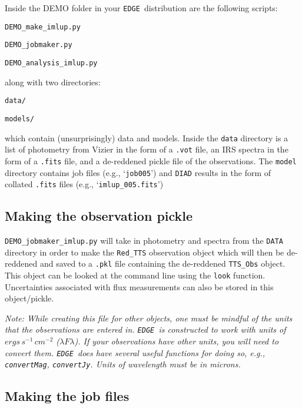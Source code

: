 \documentclass{emulateapj}
\newcommand{\edge}{\texttt{EDGE }}
\begin{document}
Inside the DEMO folder in your \edge distribution are the following scripts:

\vspace{2mm}
\texttt{DEMO\_make\_imlup.py}

\texttt{DEMO\_jobmaker.py}

\texttt{DEMO\_analysis\_imlup.py}
\vspace{2mm}

\noindent along with two directories:

\vspace{2mm}
\texttt{data/}

\texttt{models/}
\vspace{2mm}

which contain (unsurprisingly) data and models. Inside the \texttt{data} directory is a list of photometry from Vizier in the form of a \texttt{.vot} file,  an IRS spectra in the form of a \texttt{.fits} file, and a de-reddened pickle file of the observations. The \texttt{model} directory contains job files (e.g., `\texttt{job005}') and \texttt{DIAD} results in the form of collated \texttt{.fits} files (e.g., `\texttt{imlup\_005.fits}')

\subsection{Making the observation pickle}

\texttt{DEMO\_jobmaker\_imlup.py} will take in photometry and spectra from the \texttt{DATA} directory in order to make the \texttt{Red\_TTS} observation object which will then be de-reddened and saved to a \texttt{.pkl} file containing the de-reddened \texttt{TTS\_Obs} object. This object can be looked at the command line using the \texttt{look} function. Uncertainties associated with flux measurements can also be stored in this object/pickle.

\textit{Note: While creating this file for other objects, one must be mindful of the units that the observations are entered in. \edge is constructed to work with units of $ergs\,s^{-1}\,cm^{-2}$ ($\lambda F \lambda$). If your observations have other units, you will need to convert them. \edge does have several useful functions for doing so, e.g., \texttt{convertMag}, \texttt{convertJy}. Units of wavelength must be in microns.}

\subsection{Making the job files}
\end{document}
